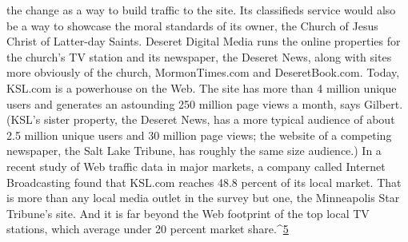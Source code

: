 the change as a way to build traffic to the site. Its classifieds service would also be
a way to showcase the moral standards of its owner, the Church of Jesus Christ
of Latter-day Saints. Deseret Digital Media runs the online properties for the
church’s TV station and its newspaper, the Deseret News, along with sites more
obviously of the church, MormonTimes.com and DeseretBook.com.
Today, KSL.com is a powerhouse on the Web. The site has more than 4 million
unique users and generates an astounding 250 million page views a month, says
Gilbert. (KSL’s sister property, the Deseret News, has a more typical audience of
about 2.5 million unique users and 30 million page views; the website of a competing
newspaper, the Salt Lake Tribune, has roughly the same size audience.) In
a recent study of Web traffic data in major markets, a company called Internet
Broadcasting found that KSL.com reaches 48.8 percent of its local market. That
is more than any local media outlet in the survey but one, the Minneapolis Star
Tribune’s site. And it is far beyond the Web footprint of the top local TV stations,
which average under 20 percent market share.^{\href{#endnotes-ch8}{5}}

